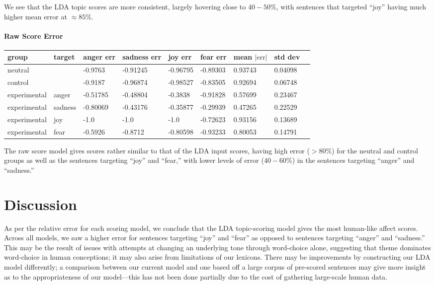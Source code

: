 \documentclass[11pt, twoside, reqno]{book}
\begin{document}
We see that the LDA topic scores are more consistent, largely hovering close to $40-50\%$, with sentences that targeted ``joy'' having much higher mean error at $\approx85\%$.

\subsubsection{\textbf{Raw Score Error}}

\begin{tabular}{|l|l|l|l|l|l|l|l|l|}
\hline
    group & target & anger err & sadness err & joy err & fear err & mean $|\text{err}|$ & std dev  \\ \hline
    neutral &  & -0.9763 & -0.91245 & -0.96795 & -0.89303 & 0.93743 & 0.04098  \\ \hline
    control &  & -0.9187 & -0.96874 & -0.98527 & -0.83505 & 0.92694 & 0.06748  \\ \hline
    experimental & anger & -0.51785 & -0.48804 & -0.3838 & -0.91828 & 0.57699 & 0.23467  \\ \hline
    experimental & sadness & -0.80069 & -0.43176 & -0.35877 & -0.29939 & 0.47265 & 0.22529  \\ \hline
    experimental & joy & -1.0 & -1.0 & -1.0 & -0.72623 & 0.93156 & 0.13689  \\ \hline
    experimental & fear & -0.5926 & -0.8712 & -0.80598 & -0.93233 & 0.80053 & 0.14791  \\ \hline
\end{tabular}
\vspace{16pt}

The raw score model gives scores rather similar to that of the LDA input scores, having high error ($>80\%$) for the neutral and control groups as well as the sentences targeting ``joy'' and ``fear,'' with lower levels of error ($40-60\%$) in the sentences targeting ``anger'' and ``sadness.''

\chapter{Discussion}

As per the relative error for each scoring model, we conclude that the LDA topic-scoring model gives the most human-like affect scores. Across all models, we saw a higher error for sentences targeting ``joy'' and ``fear'' as opposed to sentences targeting ``anger'' and ``sadness.'' This may be the result of issues with attempts at changing an underlying tone through word-choice alone, suggesting that theme dominates word-choice in human conceptions; it may also arise from limitations of our lexicons. There may be improvements by constructing our LDA model differently; a comparison between our current model and one based off a large corpus of pre-scored sentences may give more insight as to the appropriateness of our model—this has not been done partially due to the cost of gathering large-scale human data.
\end{document}

